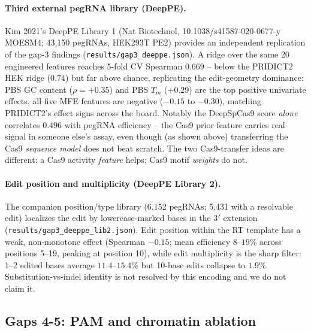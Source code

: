 \documentclass[12pt]{article}
\begin{document}
\paragraph{Third external pegRNA library (DeepPE).} Kim 2021's DeepPE
Library 1 (Nat Biotechnol, 10.1038/s41587-020-0677-y MOESM4; 43{,}150
pegRNAs, HEK293T PE2) provides an independent replication of the gap-3
findings (\texttt{results/gap3\_deeppe.json}). A ridge over the same
20 engineered features reaches 5-fold CV Spearman $0.669$ -- below the
PRIDICT2 HEK ridge ($0.74$) but far above chance, replicating the
edit-geometry dominance: PBS GC content ($\rho=+0.35$) and PBS $T_m$
($+0.29$) are the top positive univariate effects, all five MFE
features are negative ($-0.15$ to $-0.30$), matching PRIDICT2's effect
signs across the board. Notably the DeepSpCas9 score \emph{alone}
correlates $0.496$ with pegRNA efficiency -- the Cas9 prior feature
carries real signal in someone else's assay, even though (as shown
above) transferring the Cas9 \emph{sequence model} does not beat
scratch. The two Cas9-transfer ideas are different: a Cas9 activity
\emph{feature} helps; Cas9 motif \emph{weights} do not.
\paragraph{Edit position and multiplicity (DeepPE Library 2).} The
companion position/type library (6{,}152 pegRNAs; 5{,}431 with a
resolvable edit) localizes the edit by lowercase-marked bases in the
3$'$ extension (\texttt{results/gap3\_deeppe\_lib2.json}). Edit
position within the RT template has a weak, non-monotone effect
(Spearman $-0.15$; mean efficiency $8$--$19\%$ across positions
5--19, peaking at position 10), while edit multiplicity is the sharp
filter: 1--2 edited bases average $11.4$--$15.4\%$ but 10-base edits
collapse to $1.9\%$. Substitution-vs-indel identity is not resolved
by this encoding and we do not claim it.
\subsection{Gaps 4-5: PAM and chromatin ablation}
\end{document}
